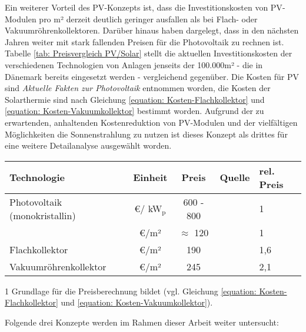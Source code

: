 Ein weiterer Vorteil des \ac{PV}-Konzepts ist, dass die Investitionskosten von \ac{PV}-Modulen pro m² derzeit deutlich geringer ausfallen als bei Flach- oder Vakuumröhrenkollektoren. Darüber hinaus haben \citet{Vartiainen2019} dargelegt, dass in den nächsten Jahren weiter mit stark fallenden Preisen für die Photovoltaik zu rechnen ist. Tabelle \ref{tab: Preisvergleich PV/Solar} stellt die aktuellen Investitionskosten der verschiedenen Technologien von Anlagen jenseits der 100.000m² - die in Dänemark bereits eingesetzt werden - vergleichend gegenüber. Die Kosten für \ac{PV} sind \textit{Aktuelle Fakten zur Photovoltaik} \cite{ISE} entnommen worden, die Kosten der Solarthermie sind nach Gleichung \ref{equation: Kosten-Flachkollektor} und \ref{equation: Kosten-Vakuumkollektor} bestimmt worden. Aufgrund der zu erwartenden, anhaltenden Kostenreduktion von \ac{PV}-Modulen und der vielfältigen Möglichkeiten die Sonnenstrahlung zu nutzen ist dieses Konzept als drittes für eine weitere Detailanalyse ausgewählt worden.
\newpage
	\begin{center}
		\begin{threeparttable}
		\begin{tabular}{lcccl}
			\hline 
			\rule{0pt}{12pt} Technologie  & Einheit & Preis & Quelle & rel. Preis\tabularnewline
			\hline
			Photovoltaik (monokristallin)  &  \euro / kW$_\text{p}$ &  600 - 800 & \cite{ISE} & 1  \tabularnewline
			 & \euro/m² & $\approx$ 120 & & 1 \tabularnewline
			Flachkollektor & \euro/m²  & 190 & \cite{Waermenetz40}\tnote{1} & 1,6\tabularnewline
			Vakuumröhrenkollektor & \euro/m² & 245 & \cite{Waermenetz40} & 2,1\tabularnewline
			\hline
		\end{tabular}
		\begin{tablenotes}\footnotesize 
			\item[1] Grundlage für die Preisberechnung bildet \citet{Waermenetz40} (vgl. Gleichung \ref{equation: Kosten-Flachkollektor} und \ref{equation: Kosten-Vakuumkollektor}).
		\end{tablenotes}
	\end{threeparttable}
		\label{tab: Preisvergleich PV/Solar}
	\end{center} 
Folgende drei Konzepte werden im Rahmen dieser Arbeit weiter untersucht:
